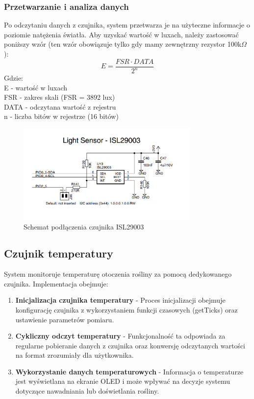 \documentclass{article}
\begin{document}
    \subsubsection{Przetwarzanie i analiza danych}
    Po odczytaniu danych z czujnika, system przetwarza je na użyteczne informacje o poziomie natężenia światła. Aby uzyskać wartość w luxach, należy zastosować poniższy wzór (ten wzór obowiązuje tylko gdy mamy zewnętrzny rezystor 100k$\Omega$):\\
    \[
    E = \frac{FSR \cdot DATA}{2^{n}}
    \]
    Gdzie:\\
    E - wartość w luxach\\
    FSR - zakres skali (FSR = 3892 lux)\\
    DATA - odczytana wartość z rejestru\\
    n - liczba bitów w rejestrze (16 bitów)\\

    \begin{figure}[H]
        \centering
        \includegraphics[width=0.8\textwidth]{doc/ISL29003/schemat.png}
        \caption{Schemat podłączenia czujnika ISL29003}
        \label{fig:czujnik_swiatla}
    \end{figure}





\subsection{Czujnik temperatury}
System monitoruje temperaturę otoczenia rośliny za pomocą dedykowanego czujnika. Implementacja obejmuje:

\begin{enumerate}
    \item \textbf{Inicjalizacja czujnika temperatury} - Proces inicjalizacji obejmuje konfigurację czujnika z wykorzystaniem funkcji czasowych (getTicks) oraz ustawienie parametrów pomiaru.
    
    \item \textbf{Cykliczny odczyt temperatury} - Funkcjonalność ta odpowiada za regularne pobieranie danych z czujnika oraz konwersję odczytanych wartości na format zrozumiały dla użytkownika.
    
    \item \textbf{Wykorzystanie danych temperaturowych} - Informacja o temperaturze jest wyświetlana na ekranie OLED i może wpływać na decyzje systemu dotyczące nawadniania lub doświetlania rośliny.
\end{enumerate}
\end{document}
